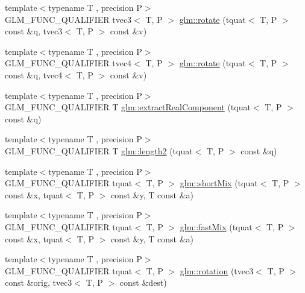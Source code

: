 \begin{DoxyCompactItemize}
\item 
{\footnotesize template$<$typename T , precision P$>$ }\\G\-L\-M\-\_\-\-F\-U\-N\-C\-\_\-\-Q\-U\-A\-L\-I\-F\-I\-E\-R tvec3$<$ T, P $>$ \hyperlink{group__gtx__quaternion_ga9f39f0d3ecd66839a4af44560aa10fb2}{glm\-::rotate} (tquat$<$ T, P $>$ const \&q, tvec3$<$ T, P $>$ const \&v)
\item 
{\footnotesize template$<$typename T , precision P$>$ }\\G\-L\-M\-\_\-\-F\-U\-N\-C\-\_\-\-Q\-U\-A\-L\-I\-F\-I\-E\-R tvec4$<$ T, P $>$ \hyperlink{group__gtx__quaternion_ga96575f8868b3f2aa3e13cab9b94ccbd3}{glm\-::rotate} (tquat$<$ T, P $>$ const \&q, tvec4$<$ T, P $>$ const \&v)
\item 
{\footnotesize template$<$typename T , precision P$>$ }\\G\-L\-M\-\_\-\-F\-U\-N\-C\-\_\-\-Q\-U\-A\-L\-I\-F\-I\-E\-R T \hyperlink{group__gtx__quaternion_ga90de879d97487ec804522dd418e5d8a0}{glm\-::extract\-Real\-Component} (tquat$<$ T, P $>$ const \&q)
\item 
{\footnotesize template$<$typename T , precision P$>$ }\\G\-L\-M\-\_\-\-F\-U\-N\-C\-\_\-\-Q\-U\-A\-L\-I\-F\-I\-E\-R T \hyperlink{group__gtx__quaternion_ga02b45352c7ac345cabc9e877314acda6}{glm\-::length2} (tquat$<$ T, P $>$ const \&q)
\item 
{\footnotesize template$<$typename T , precision P$>$ }\\G\-L\-M\-\_\-\-F\-U\-N\-C\-\_\-\-Q\-U\-A\-L\-I\-F\-I\-E\-R tquat$<$ T, P $>$ \hyperlink{group__gtx__quaternion_ga3534443de2a1a806f386976546cddc81}{glm\-::short\-Mix} (tquat$<$ T, P $>$ const \&x, tquat$<$ T, P $>$ const \&y, T const \&a)
\item 
{\footnotesize template$<$typename T , precision P$>$ }\\G\-L\-M\-\_\-\-F\-U\-N\-C\-\_\-\-Q\-U\-A\-L\-I\-F\-I\-E\-R tquat$<$ T, P $>$ \hyperlink{group__gtx__quaternion_gac11bf550f17d1da14423595a27575084}{glm\-::fast\-Mix} (tquat$<$ T, P $>$ const \&x, tquat$<$ T, P $>$ const \&y, T const \&a)
\item 
{\footnotesize template$<$typename T , precision P$>$ }\\G\-L\-M\-\_\-\-F\-U\-N\-C\-\_\-\-Q\-U\-A\-L\-I\-F\-I\-E\-R tquat$<$ T, P $>$ \hyperlink{group__gtx__quaternion_gac4856d356c5c97cec74e9b672ea89240}{glm\-::rotation} (tvec3$<$ T, P $>$ const \&orig, tvec3$<$ T, P $>$ const \&dest)
\end{DoxyCompactItemize}


